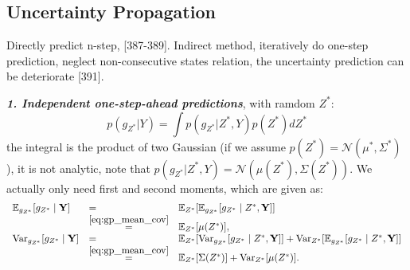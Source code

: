 \documentclass[10pt]{elegantbook}
\newcommand{\mydefination}[1]{\textbf{\textit{\textcolor{structurecolor}{#1}}}}
\begin{document}
\subsection{Uncertainty Propagation}

Directly predict n-step, [387-389]. Indirect method, iteratively do one-step prediction, neglect non-consecutive states relation, 
the uncertainty prediction can be deteriorate [391].

\mydefination{1. Independent one-step-ahead predictions}, with ramdom $Z^*$:
\begin{equation} \label{eq:posterior_of_ramdom_input}
    p(g_{Z^{*}}|Y)=\int p(g_{Z^{*}}|Z^{*},Y)p(Z^{*})d Z^{*}
\end{equation}
the integral is the product of two Gaussian (if we assume $p(Z^{*}) = \mathcal N(\mu^*, \Sigma^*)$), it is not analytic, 
note that $p(g_{Z^{*}}|Z^{*},Y) = \mathcal N(\mu(Z^*), \Sigma(Z^*))$.
We actually only need first and second moments, which are given as:
\begin{equation} \label{eq:expect_mean_and_cov}
\begin{array}{lll}
\mathbb{E}_{g_{Z^*}}[g_{Z^*} \mid \mathbf{Y}] 
&=& \mathbb{E}_{Z^*}[\mathbb{E}_{g_{Z^*}}[g_{Z^*} \mid Z^*, \mathbf{Y}]] \\
&\overset{\ref{eq:gp_mean_cov}}{=}& \mathbb{E}_{Z^*}[\mu(Z^*)], \\
\text{Var}_{g_{Z^*}}[g_{Z^*} \mid \mathbf{Y}] 
&=& \mathbb{E}_{Z^*}[\text{Var}_{g_{Z^*}}[g_{Z^*} \mid Z^*, \mathbf{Y}]] 
+ \text{Var}_{Z^*}[\mathbb{E}_{g_{Z^*}}[g_{Z^*} \mid Z^*, \mathbf{Y}]] \\
&\overset{\ref{eq:gp_mean_cov}}{=}& \mathbb{E}_{Z^*}[\Sigma(Z^*)] 
+ \text{Var}_{Z^*}[\mu(Z^*)].
\end{array}
\end{equation}
\end{document}
